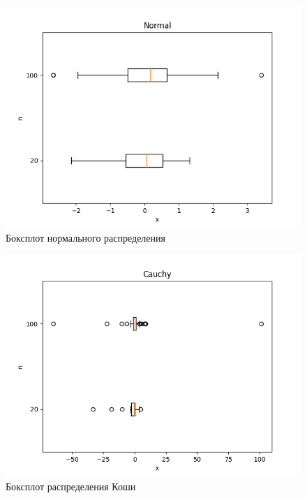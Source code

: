 \begin{figure}[H]
	\centering
	\includegraphics[scale=0.65]{normal_boxplot.png}
	\caption{Боксплот нормального распределения}
\end{figure}

\begin{figure}[H]
	\centering
	\includegraphics[scale=0.65]{cauchy_boxplot.png}
	\caption{Боксплот распределения Коши}
\end{figure}

